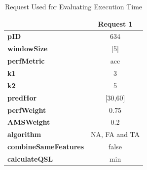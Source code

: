 \begin{table}[h]
\centering
    \begin{tabular}{ l | c}
        \toprule
        &
\textbf{Request 1}      
 \\\midrule

\textbf{pID} & 634 \\\midrule
\textbf{windowSize} & [5] \\\midrule
\textbf{perfMetric} & acc  \\\midrule
\textbf{k1} & 3\\\midrule
\textbf{k2} & 5 \\\midrule
\textbf{predHor} & [30,60]\\\midrule
\textbf{perfWeight} & 0.75 \\\midrule
\textbf{AMSWeight} & 0.2\\\midrule
\textbf{algorithm}  & NA, FA and TA  \\\midrule
\textbf{combineSameFeatures} & false \\\midrule
\textbf{calculateQSL} & min \\
        \bottomrule
    \end{tabular}
\caption{Request Used for Evaluating Execution Time} \label{time}
\end{table}




